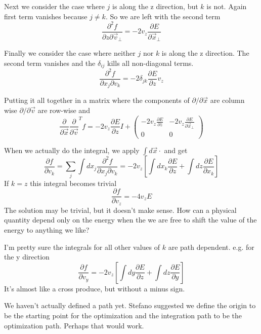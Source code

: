 \documentclass[a4paper]{article}
\begin{document}
Next we consider the case where $j$ is along the z direction, but $k$ is not.
Again first term vanishes because $j \ne k$.  So we are left with the second term
\begin{equation}
\frac{\partial^2 f}{\partial {z} \partial \vec{v}_\perp} = 
- 2 {v_z} \frac{\partial E}{\partial \vec{x}_\perp}
\end{equation}

Finally we consider the case where neither $j$ nor $k$ is along the z direction.
The second term vanishes and the $\delta_{ij}$ kills all non-diagonal terms.
\begin{equation}
\frac{\partial^2 f}{\partial {x_j} \partial {v_k}} = 
- 2 \delta_{jk} \frac{\partial E}{\partial z} v_z
\end{equation}

Putting it all together in a matrix where the components of 
$\partial / \partial \vec{x}$ are column wise
$\partial / \partial \vec{v}$ are row-wise and
\begin{equation}
\frac{\partial}{\partial \vec{x}} 
\frac{\partial}{\partial \vec{v}}^{T}
f = 
- 2 v_z \frac{\partial E}{\partial z}  I +
\begin{pmatrix}
- 2 v_z \frac{\partial E}{\partial z}
& 
- 2 {v_z} \frac{\partial E}{\partial \vec{x}_\perp}
 \\
0 & 0 
\end{pmatrix}
\end{equation}

When we actually do  the integral, we apply $\int d \vec{x} \cdot$ and get
\begin{equation}
\frac{\partial f}{\partial {v_k}} = 
\sum_j \int dx_j
\frac{\partial^2 f}{\partial {x_j} \partial {v_k}} = 
- 2 {v_z} \left[ \int  d x_k
\frac{\partial E}{\partial z}
+ \int d z
\frac{\partial E}{\partial {x_k}}
\right]
\end{equation}
If $k=z$ this integral becomes trivial
\begin{equation}
\frac{\partial f}{\partial {v_z}} = 
- 4 {v_z} E
\end{equation}
The solution may be trivial, but it doesn't make sense.  How can a physical quantity depend only on the energy when the we are
free to shift the value of the energy to anything we like?

I'm pretty sure the integrals for all other values of $k$ are path dependent.  e.g. for the y direction
\begin{equation}
\frac{\partial f}{\partial {v_y}} = 
- 2 {v_z} \left[ \int  d y
\frac{\partial E}{\partial z}
+ \int d z
\frac{\partial E}{\partial {y}}
\right]
\end{equation}
It's almost like a cross produce, but without a minus sign.   

We haven't actually defined a path yet.
Stefano suggested we define the origin to be the starting point for the
optimization and the integration path to be the optimization path.  Perhaps that would work.
\end{document}
